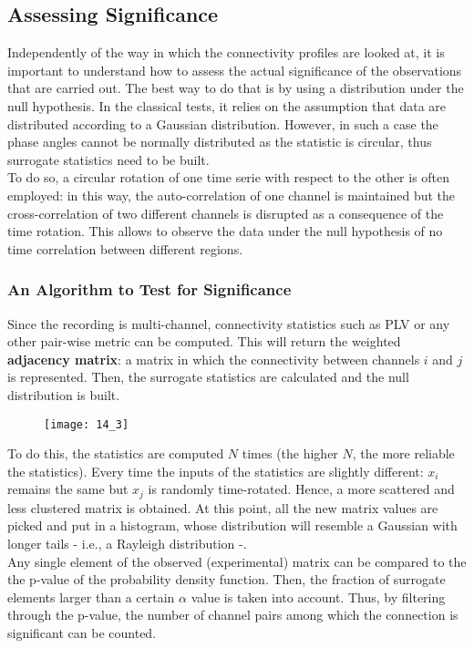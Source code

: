 \subsection{Assessing Significance}
Independently of the way in which the connectivity profiles are looked at, it is important to understand
how to assess the actual significance of the observations that are carried out. The best way to do that
is by using a distribution under the null hypothesis. In the classical tests, it relies on the
assumption that data are distributed according to a Gaussian distribution. However, in such a case the
phase angles cannot be normally distributed as the statistic is circular, thus surrogate statistics need
to be built.\\
To do so, a circular rotation of one time serie with respect to the other is often employed: in this way,
the auto-correlation of one channel is maintained but the cross-correlation of two different channels is
disrupted as a consequence of the time rotation. This allows to observe the data under the null
hypothesis of no time correlation between different regions.
\subsubsection{An Algorithm to Test for Significance}
Since the recording is multi-channel, connectivity statistics such as PLV or any other pair-wise metric
can be computed. This will return the weighted \textbf{adjacency matrix}: a matrix in which the
connectivity between channels \(i\) and \(j\) is represented. Then, the surrogate statistics are calculated
and the null distribution is built.
\begin{figure}[H]
    \centering
    \texttt{[image: 14\_3]}
\end{figure}
To do this, the statistics are computed \(N\) times (the higher \(N\), the more reliable the statistics).
Every time the inputs of the statistics are slightly different: \(x_i\) remains the same but \(x_j\) is
randomly time-rotated. Hence, a more scattered and less clustered matrix is obtained. At this point, all
the new matrix values are picked and put in a histogram, whose distribution will resemble a Gaussian with
longer tails - i.e., a Rayleigh distribution -.\\
Any single element of the observed (experimental) matrix can be compared to the the p-value of the
probability density function. Then, the fraction of surrogate elements larger than a certain \(\alpha\)
value is taken into account. Thus, by filtering through the p-value, the number of channel pairs among
which the connection is significant can be counted.
